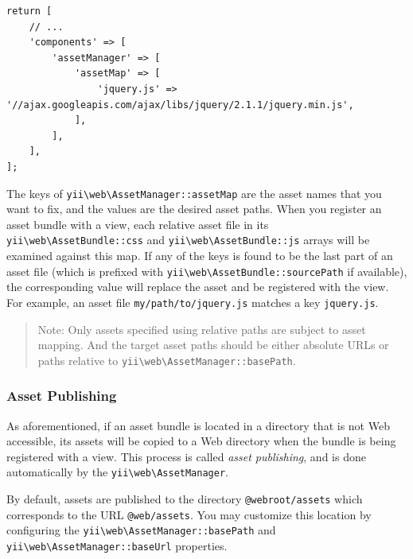 \lstset{language=php}\begin{lstlisting}
return [
    // ...
    'components' => [
        'assetManager' => [
            'assetMap' => [
                'jquery.js' => '//ajax.googleapis.com/ajax/libs/jquery/2.1.1/jquery.min.js',
            ],
        ],
    ],
];
\end{lstlisting}
The keys of \texttt{yii{\allowbreak{}\textbackslash}web{\allowbreak{}\textbackslash}AssetManager\allowbreak{}::\allowbreak{}assetMap} are the asset names that you want to fix, and the values
are the desired asset paths. When you register an asset bundle with a view, each relative asset file in its
\texttt{yii{\allowbreak{}\textbackslash}web{\allowbreak{}\textbackslash}AssetBundle\allowbreak{}::\allowbreak{}css} and \texttt{yii{\allowbreak{}\textbackslash}web{\allowbreak{}\textbackslash}AssetBundle\allowbreak{}::\allowbreak{}js} arrays will be examined against this map.
If any of the keys is found to be the last part of an asset file (which is prefixed with \texttt{yii{\allowbreak{}\textbackslash}web{\allowbreak{}\textbackslash}AssetBundle\allowbreak{}::\allowbreak{}sourcePath}
if available), the corresponding value will replace the asset and be registered with the view.
For example, an asset file \lstinline|my/path/to/jquery.js| matches a key \lstinline|jquery.js|.

\begin{quote}Note: Only assets specified using relative paths are subject to asset mapping. And the target asset paths
  should be either absolute URLs or paths relative to \texttt{yii{\allowbreak{}\textbackslash}web{\allowbreak{}\textbackslash}AssetManager\allowbreak{}::\allowbreak{}basePath}.

\end{quote}
\subsubsection{Asset Publishing \label{structure-assets.md::asset-publishing}}
As aforementioned, if an asset bundle is located in a directory that is not Web accessible, its assets will be copied
to a Web directory when the bundle is being registered with a view. This process is called \textit{asset publishing}, and is done
automatically by the \texttt{yii{\allowbreak{}\textbackslash}web{\allowbreak{}\textbackslash}AssetManager}.

By default, assets are published to the directory \lstinline|@webroot/assets| which corresponds to the URL \lstinline|@web/assets|.
You may customize this location by configuring the \texttt{yii{\allowbreak{}\textbackslash}web{\allowbreak{}\textbackslash}AssetManager\allowbreak{}::\allowbreak{}basePath} and
\texttt{yii{\allowbreak{}\textbackslash}web{\allowbreak{}\textbackslash}AssetManager\allowbreak{}::\allowbreak{}baseUrl} properties.

